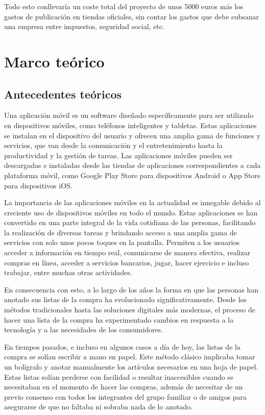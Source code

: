 \documentclass{article}
\begin{document}
Todo esto conllevaría un coste total del proyecto de unos 5000 euros más los gastos de publicación en tiendas oficiales, sin contar los gastos que debe subsanar una empresa entre impuestos, seguridad social, etc.

\section{Marco teórico}

\subsection{Antecedentes teóricos}

Una aplicación móvil es un software diseñado específicamente para ser utilizado en dispositivos móviles, como teléfonos inteligentes y tabletas. Estas aplicaciones se instalan en el dispositivo del usuario y ofrecen una amplia gama de funciones y servicios, que van desde la comunicación y el entretenimiento hasta la productividad y la gestión de tareas. Las aplicaciones móviles pueden ser descargadas e instaladas desde las tiendas de aplicaciones correspondientes a cada plataforma móvil, como Google Play Store para dispositivos Android o App Store para dispositivos iOS.

La importancia de las aplicaciones móviles en la actualidad es innegable debido al creciente uso de dispositivos móviles en todo el mundo. Estas aplicaciones se han convertido en una parte integral de la vida cotidiana de las personas, facilitando la realización de diversas tareas y brindando acceso a una amplia gama de servicios con solo unos pocos toques en la pantalla. Permiten a los usuarios acceder a información en tiempo real, comunicarse de manera efectiva, realizar compras en línea, acceder a servicios bancarios, jugar, hacer ejercicio e incluso trabajar, entre muchas otras actividades.

En consecuencia con esto, a lo largo de los años la forma en que las personas han anotado sus listas de la compra ha evolucionado significativamente. Desde los métodos tradicionales hasta las soluciones digitales más modernas, el proceso de hacer una lista de la compra ha experimentado cambios en respuesta a la tecnología y a las necesidades de los consumidores.

En tiempos pasados, e incluso en algunos casos a día de hoy, las listas de la compra se solían escribir a mano en papel. Este método clásico implicaba tomar un bolígrafo y anotar manualmente los artículos necesarios en una hoja de papel. Estas listas solían perderse con facilidad o resultar inaccesibles cuando se necesitaban en el momento de hacer las compras, además de necesitar de un previo consenso con todos los integrantes del grupo familiar o de amigos para asegurarse de que no faltaba ni sobraba nada de lo anotado.
\end{document}
